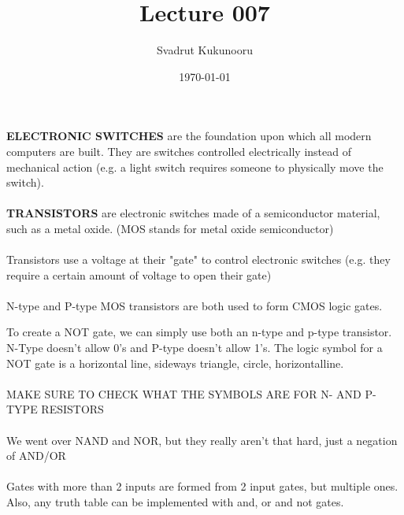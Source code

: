 \documentclass[letterpaper]{report}
\title{Lecture 007}
\author{Svadrut Kukunooru}
\date{\today}
\begin{document}
\begin{titlepage}
    \maketitle
\end{titlepage}

\textbf{ELECTRONIC SWITCHES} are the foundation upon which all modern computers are built. They are switches controlled electrically instead of mechanical action (e.g. a light switch requires someone to physically move the switch). \\ \\ 
\textbf{TRANSISTORS} are electronic switches made of a semiconductor material, such as a metal oxide. (MOS stands for metal oxide semiconductor) \\ \\
Transistors use a voltage at their "gate" to control electronic switches (e.g. they require a certain amount of voltage to open their gate) \\ \\ 

N-type and P-type MOS transistors are both used to form CMOS logic gates. 

To create a NOT gate, we can simply use both an n-type and p-type transistor. N-Type doesn't allow 0's and P-type doesn't allow 1's. The logic symbol for a NOT gate is a horizontal line, sideways triangle, circle, horizontalline. \\ \\ 

MAKE SURE TO CHECK WHAT THE SYMBOLS ARE FOR N- AND P-TYPE RESISTORS \\ \\ 

We went over NAND and NOR, but they really aren't that hard, just a negation of AND/OR \\ \\ 

Gates with more than 2 inputs are formed from 2 input gates, but multiple ones. Also, any truth table can be implemented with and, or and not gates. 
\end{document}

